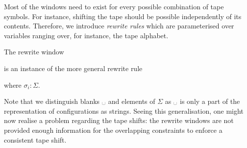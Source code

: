 Most of the windows need to exist for every possible combination of tape symbols. For instance, shifting the tape should be possible independently of its contents. Therefore, we introduce \emph{rewrite rules} which are parameterised over variables ranging over, for instance, the tape alphabet.
\begin{example}
  The rewrite window
  \begin{center}
  \end{center}
  is an instance of the more general rewrite rule
  \begin{center}
  \end{center}
  where $\sigma_i : \Sigma$. 
\end{example}
Note that we distinguish blanks $\blank$ and elements of $\Sigma$ as $\blank$ is only a part of the representation of configurations as strings.
Seeing this generalisation, one might now realise a problem regarding the tape shifts: the rewrite windows are not provided enough information for the overlapping constraints to enforce a consistent tape shift.
